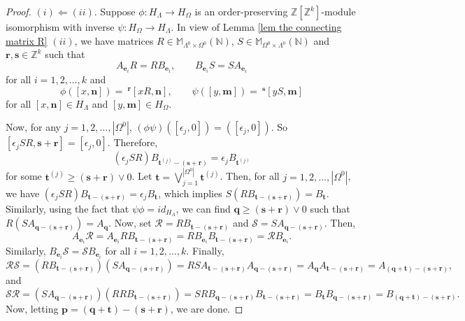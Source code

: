 \documentclass[12pt]{amsart}
\newcommand{\N}{\mathbf{n}}
\newcommand{\M}{\mathbf{m}}
\theoremstyle{definition}
\theoremstyle{remark}
\begin{document}
\begin{proof}
$(i)\Longleftarrow (ii)$. Suppose $\phi:H_\Lambda\longrightarrow H_\Omega$ is an order-preserving $\mathbb{Z}[\mathbb{Z}^k]$-module isomorphism with inverse $\psi:H_\Omega\longrightarrow H_\Lambda$. In view of Lemma \ref{lem the connecting matrix R} $(ii)$, we have matrices $R\in \mathbb{M}_{\Lambda^0\times \Omega^0}(\mathbb{N})$, $S\in \mathbb{M}_{\Omega^0\times \Lambda^0}(\mathbb{N})$ and $\mathbf{r},\mathbf{s}\in \mathbb{Z}^k$ such that \[A_{\mathbf{e}_i}R=RB_{\mathbf{e}_i}, ~~~~~~~~~B_{\mathbf{e}_i}S=SA_{\mathbf{e}_i}\] for all $i=1,2,\ldots,k$ and \[\phi([x,\N])=~^\mathbf{r}[xR,\N],~~~~~~~~~\psi([y,\M])=~^\mathbf{s}[yS,\M]\] for all $[x,\N]\in H_\Lambda$ and $[y,\M]\in H_\Omega$. 

Now, for any $j=1,2,\ldots,|\Omega^0|$, $(\phi\psi)([\epsilon_j,0])=([\epsilon_j,0])$. So $[\epsilon_jSR,\mathbf{s}+\mathbf{r}]=[\epsilon_j,0]$. Therefore, \[(\epsilon_jSR)B_{\mathbf{t}^{(j)}-(\mathbf{s}+\mathbf{r})}=\epsilon_jB_{\mathbf{t}^{(j)}}\] for some $\mathbf{t}^{(j)}\ge (\mathbf{s}+\mathbf{r})\vee 0$. Let $\mathbf{t}=\displaystyle{\bigvee_{j=1}^{|\Omega^0|}}\mathbf{t}^{(j)}$. Then, for all $j=1,2,\ldots,|\Omega^0|$, we have $(\epsilon_jSR)B_{\mathbf{t}-(\mathbf{s}+\mathbf{r})}=\epsilon_jB_\mathbf{t}$, which implies $S(RB_{\mathbf{t}-(\mathbf{s}+\mathbf{r})})=B_\mathbf{t}$. Similarly, using the fact that $\psi\phi=id_{H_\Lambda}$, we can find $\mathbf{q}\ge (\mathbf{s}+\mathbf{r})\vee 0$ such that $R(SA_{\mathbf{q}-(\mathbf{s}+\mathbf{r})})=A_\mathbf{q}$. Now, set $\mathcal{R}=RB_{\mathbf{t}-(\mathbf{s}+\mathbf{r})}$ and $\mathcal{S}=SA_{\mathbf{q}-(\mathbf{s}+\mathbf{r})}$. Then, \[A_{\mathbf{e}_i}\mathcal{R}=A_{\mathbf{e}_i}RB_{\mathbf{t}-(\mathbf{s}+\mathbf{r})}=RB_{\mathbf{e}_i}B_{\mathbf{t}-(\mathbf{s}+\mathbf{r})}=\mathcal{R}B_{\mathbf{e}_i}.\] Similarly, $B_{\mathbf{e}_i}\mathcal{S}=\mathcal{S}B_{\mathbf{e}_i}$ for all $i=1,2,\ldots,k$. Finally, \[\mathcal{R}\mathcal{S}=(RB_{\mathbf{t}-(\mathbf{s}+\mathbf{r})})(SA_{\mathbf{q}-(\mathbf{s}+\mathbf{r})})=RSA_{\mathbf{t}-(\mathbf{s}+\mathbf{r})}A_{\mathbf{q}-(\mathbf{s}+\mathbf{r})}=A_\mathbf{q}A_{\mathbf{t}-(\mathbf{s}+\mathbf{r})}=A_{(\mathbf{q}+\mathbf{t})-(\mathbf{s}+\mathbf{r})},\] and \[\mathcal{S}\mathcal{R}=(SA_{\mathbf{q}-(\mathbf{s}+\mathbf{r})})(RRB_{\mathbf{t}-(\mathbf{s}+\mathbf{r})})=SRB_{\mathbf{q}-(\mathbf{s}+\mathbf{r})}B_{\mathbf{t}-(\mathbf{s}+\mathbf{r})}=B_\mathbf{t}B_{\mathbf{q}-(\mathbf{s}+\mathbf{r})}=B_{(\mathbf{q}+\mathbf{t})-(\mathbf{s}+\mathbf{r})}.\] Now, letting $\mathbf{p}=(\mathbf{q}+\mathbf{t})-(\mathbf{s}+\mathbf{r})$, we are done. 
\end{proof}
\end{document}
